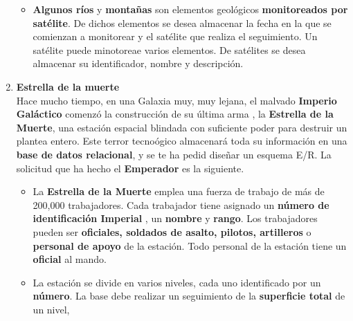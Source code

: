 \documentclass{article}
\begin{document}
\begin{enumerate}[label = (\alph*)]
{\begin{itemize}
{                    \textbf{origen volcánico} o de \textbf{plegamiento}. En
                    el caso de que su origen sea volcánico, se desea 
                    almacenar el tipo de volcán y si es plegamiento, se 
                    almacenará el periodo geológico de dicho plegamiento.
                }
                \item {
                    \textbf{Algunos ríos} y \textbf{montañas} son elementos 
                    geológicos \textbf{monitoreados por satélite}. De dichos 
                    elementos se desea almacenar la fecha en la que se 
                    comienzan a monitorear y el satélite que realiza el 
                    seguimiento. Un satélite puede minotoreae varios 
                    elementos. De satélites se desea almacenar su 
                    identificador, nombre y descripción.
                }
            \end{itemize}
        }
        \item {
            \textbf{Estrella de la muerte} \\
            Hace mucho tiempo, en una Galaxia muy, muy lejana, el malvado 
            \textbf{Imperio Galáctico} comenzó la construcción de su última arma
            , la \textbf{Estrella de la Muerte}, una estación espacial blindada
            con suficiente poder para destruir un plantea entero. Este terror 
            tecnoógico almacenará toda su información en una \textbf{base de 
            datos relacional}, y se te ha pedid diseñar un esquema E/R. La 
            solicitud que ha hecho el \textbf{Emperador} es la siguiente.
            \begin{itemize}
                \item {
                    La \textbf{Estrella de la Muerte} emplea una fuerza de 
                    trabajo de más de 200,000 trabajadores. Cada trabajador 
                    tiene asignado un \textbf{número de identificación Imperial}
                    , un \textbf{nombre} y \textbf{rango}. Los trabajadores 
                    pueden ser \textbf{oficiales, soldados de asalto, pilotos, 
                    artilleros} o \textbf{personal de apoyo} de la estación. 
                    Todo personal de la estación tiene un \textbf{oficial} al 
                    mando.
                }
                \item {
                    La estación se divide en varios niveles, cada uno 
                    identificado por un \textbf{número}. La base debe realizar
                    un seguimiento de la \textbf{superficie total} de un nivel,
}
\end{itemize}}
\end{enumerate}
\end{document}
